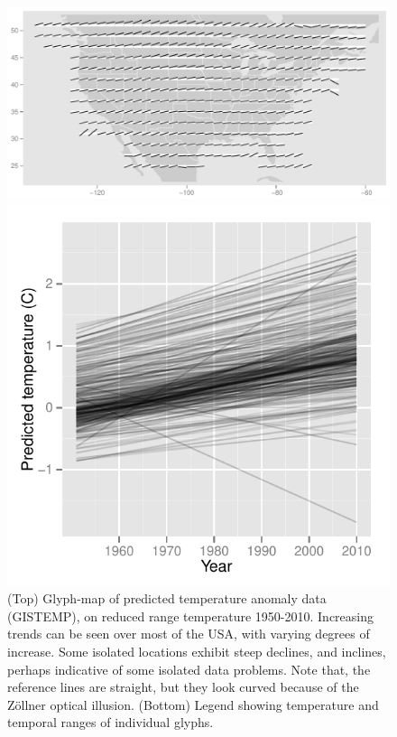 \documentclass[oneside]{article}
\begin{document}
\begin{figure}[htbp]
  \centering
  \includegraphics[width=1\linewidth]{gistemp-pred}

  \includegraphics[width=0.33\linewidth]{gistemp-pred-legend}

  \caption{(Top) Glyph-map of predicted temperature anomaly data
    (GISTEMP), on reduced range temperature 1950-2010. Increasing
    trends can be seen over most of the USA, with varying degrees of
    increase. Some isolated locations exhibit steep declines, and
    inclines, perhaps indicative of some isolated data problems. Note
    that, the reference lines are straight, but they look curved
    because of the Z\"ollner optical illusion. (Bottom) Legend showing
    temperature and temporal ranges of individual glyphs.}
  \label{fig:gistemp-pred}
\end{figure}

\end{document}
